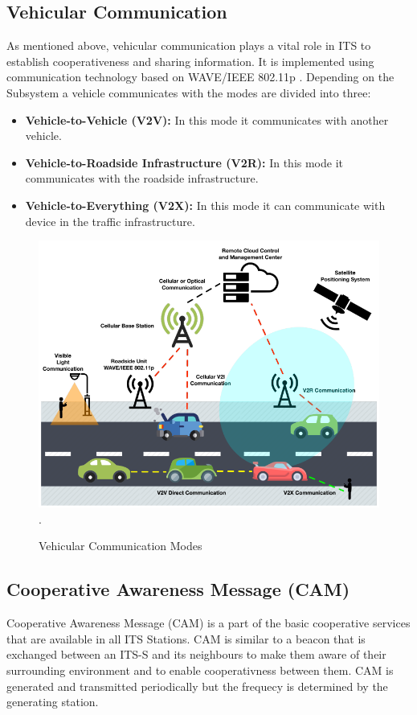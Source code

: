\subsection{Vehicular Communication}
As mentioned above, vehicular communication plays a vital role in ITS to establish cooperativeness and sharing information.  It is implemented using communication technology based on WAVE/IEEE 802.11p \cite{WAVE}. Depending on the Subsystem a vehicle communicates with the modes are divided into three:

\begin{itemize}
    \item \textbf{Vehicle-to-Vehicle (V2V): } In this mode it communicates with another vehicle.
    \item \textbf{Vehicle-to-Roadside Infrastructure (V2R): } In this mode it communicates with the roadside infrastructure.
    \item \textbf{Vehicle-to-Everything (V2X): } In this mode it can communicate with device in the traffic infrastructure.
\end{itemize}

\begin{figure}[h!]
    \centering
    \includegraphics[width=12cm]{Framework/Images/communicationModes.png}.
    \caption{Vehicular Communication Modes \cite{vComs}}
    \label{comsMode}
\end{figure}
\subsection{Cooperative Awareness Message (CAM)}
Cooperative Awareness Message (CAM) \cite{etsiCAM} is a part of the basic cooperative services that are available in all  ITS Stations. CAM is similar to a beacon that is exchanged between an ITS-S and its neighbours to make them aware of their surrounding environment and to enable cooperativness between them. CAM is generated and transmitted periodically but the frequecy is determined by the generating station. 

